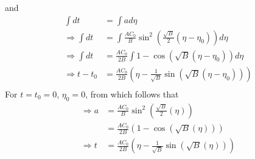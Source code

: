 \documentclass[a4paper, 11pt]{FSKH_623_Report}
\numberwithin{equation}{section}
\newcommand{\brac}[1]{\left(#1\right)}
\begin{document}
and 
\begin{equation}
\begin{split}
\int dt &= \int ad\eta \\
\Rightarrow \int dt &= \int \frac{AC_{0}}{B}\sin^{2}\brac{\frac{\sqrt{B}}{2}\brac{\eta-\eta_{0}}}d\eta \\
\Rightarrow \int dt &= \frac{AC_{0}}{2B}\int 1-\cos\brac{\sqrt{B}\brac{\eta-\eta_{0}}}d\eta \\
\Rightarrow t-t_{0} &= \frac{AC_{0}}{2B}\brac{\eta-\frac{1}{\sqrt{B}}\sin\brac{\sqrt{B}\brac{\eta-\eta_{0}}}} \\
\end{split}
\end{equation}
For $t=t_{0}=0$, $\eta_{0}=0$, from which follows that
\begin{equation}
\begin{split}
\Rightarrow a &= \frac{AC_{0}}{B}\sin^{2}\brac{\frac{\sqrt{B}}{2}\brac{\eta}}\\
&= \frac{AC_{0}}{2B}\brac{1-\cos\brac{\sqrt{B}\brac{\eta}}}\\
\Rightarrow t &= \frac{AC_{0}}{2B}\brac{\eta-\frac{1}{\sqrt{B}}\sin\brac{\sqrt{B}\brac{\eta}}} \\
\end{split}
\end{equation}
\end{document}
